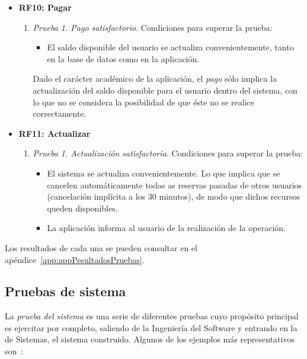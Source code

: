 \begin{itemize}
	\item \textbf{RF10: Pagar}
	\begin{enumerate}
		\item \textit{Prueba 1. Pago satisfactorio}. Condiciones para superar la prueba:
		\begin{itemize}
			\item El saldo disponible del usuario se actualiza convenientemente, tanto en la base de datos como en la aplicación.
		\end{itemize}
		
		Dado el carácter académico de la aplicación, el \emph{pago} sólo implica la actualización del saldo disponible para el usuario dentro del sistema, con lo que no se considera la posibilidad de que éste no se realice correctamente.
	\end{enumerate}
		
	\item \textbf{RF11: Actualizar}
	\begin{enumerate}
		\item \textit{Prueba 1. Actualización satisfactoria}. Condiciones para superar la prueba:
		\begin{itemize}
			\item El sistema se actualiza convenientemente. Lo que implica que se cancelen automáticamente todas as reservas pasadas de otros usuarios (cancelación implícita a los 30 minutos), de modo que dichos recursos queden disponibles.
			\item La aplicación informa al usuario de la realización de la operación.
		\end{itemize}
	\end{enumerate}
\end{itemize}

Los resultados de cada una se pueden consultar en el apéndice~\ref{app:appPesultadosPruebas}.

\subsection{Pruebas de sistema}

La \emph{prueba del sistema} es una serie de diferentes pruebas cuyo propósito principal es ejercitar por completo, saliendo de la Ingeniería del Software y entrando en la de Sistemas, el sistema construido. Algunos de los ejemplos más representativos son~\cite{Pre10}:

